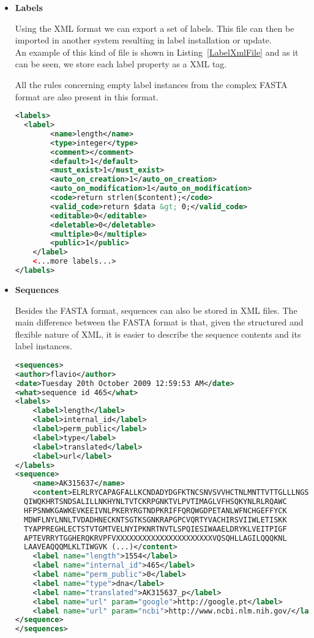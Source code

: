 \begin{itemize}
  \item \textbf{Labels}
  
  Using the XML format we can export a set of labels. This file can then be imported in another system resulting in label installation or update. \\
  
  An example of this kind of file is shown in Listing~\ref{LabelXmlFile} and as it can be seen, we store each label property as a XML tag.
  
  All the rules concerning empty label instances from the complex FASTA format are also present in this format.
  
\begin{lstlisting}[float, language=xml, frame=single, label=LabelXmlFile, caption={An example Label XML file.}]
<labels>
  <label>
		<name>length</name>
		<type>integer</type>
		<comment></comment>
		<default>1</default>
		<must_exist>1</must_exist>
		<auto_on_creation>1</auto_on_creation>
		<auto_on_modification>1</auto_on_modification>
		<code>return strlen($content);</code>
		<valid_code>return $data &gt; 0;</valid_code>
		<editable>0</editable>
		<deletable>0</deletable>
		<multiple>0</multiple>
		<public>1</public>
	</label>
	<...more labels...>
</labels>
\end{lstlisting}

\item \textbf{Sequences}

Besides the FASTA format, sequences can also be stored in XML files. The main difference between the FASTA format is that, given the structured and flexible nature of XML, it is easier to describe the sequence contents and its label instances.

\begin{lstlisting}[float, language=xml, frame=single, label=SequenceXmlFile, caption={An Sequence XML file.}]
<sequences>
<author>flavio</author>
<date>Tuesday 20th October 2009 12:59:53 AM</date>
<what>sequence id 465</what>
<labels>
	<label>length</label>
	<label>internal_id</label>
	<label>perm_public</label>
	<label>type</label>
	<label>translated</label>
	<label>url</label>
</labels>
<sequence>
	<name>AK315637</name>
	<content>ELRLRYCAPAGFALLKCNDADYDGFKTNCSNVSVVHCTNLMNTTVTTGLLLNGSYSENRT
  QIWQKHRTSNDSALILLNKHYNLTVTCKRPGNKTVLPVTIMAGLVFHSQKYNLRLRQAWC
  HFPSNWKGAWKEVKEEIVNLPKERYRGTNDPKRIFFQRQWGDPETANLWFNCHGEFFYCK
  MDWFLNYLNNLTVDADHNECKNTSGTKSGNKRAPGPCVQRTYVACHIRSVIIWLETISKK
  TYAPPREGHLECTSTVTGMTVELNYIPKNRTNVTLSPQIESIWAAELDRYKLVEITPIGF
  APTEVRRYTGGHERQKRVPFVXXXXXXXXXXXXXXXXXXXXXXVQSQHLLAGILQQQKNL
  LAAVEAQQQMLKLTIWGVK (...)</content>
	<label name="length">1554</label>
	<label name="internal_id">465</label>
	<label name="perm_public">0</label>
	<label name="type">dna</label>
	<label name="translated">AK315637_p</label>
	<label name="url" param="google">http://google.pt</label>
	<label name="url" param="ncbi">http://www.ncbi.nlm.nih.gov/</label>
</sequence>
</sequences>
\end{lstlisting}


\end{itemize}
